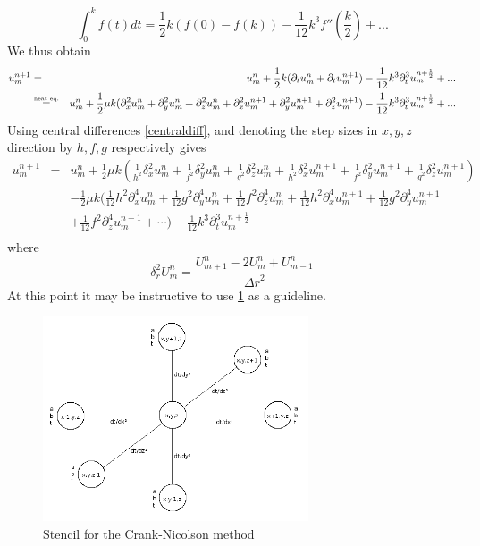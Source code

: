 \begin{equation}
\int_0^k f(t) dt = \frac{1}{2} k (f(0) - f(k)) -\frac{1}{12} k^3 f''(\frac{k}{2}) + ...
\label{trapezoidalrule}
\end{equation}
We thus obtain
\begin{eqnarray}
\label{res}
u_m^ {n+1} &=& u_m^ n + \frac{1}{2} k(\partial_t u_m^n + \partial_t u_m^{n+1}) - \frac{1}{12} k^3 \partial_t ^3 u_m^{n+\frac{1}{2}} + ...\\
&\stackrel{\text{\tiny heat eq.}}{=}& u_m^ n + \frac{1}{2} \mu k(\partial_x^2 u_m^n + \partial_y^2 u_m^n + \partial_z^2 u_m^n + \partial_x^2 u_m^{n+1} + \partial_y^2 u_m^{n+1} + \partial_z^2 u_m^{n+1}) - \frac{1}{12} k^3 \partial_t ^3    u_m^{n+\frac{1}{2}} + ... \nonumber
\end{eqnarray}
Using central differences \cref{centraldiff}, and denoting the step sizes in $x, y, z$ direction by $h, f, g$ respectively gives
\begin{eqnarray*}
u_m^{n+1} &=& u_m^ n + \frac{1}{2} \mu k(\frac{1}{h^2}\delta_x^2 u_m^n + \frac{1}{f^2}\delta_y^2 u_m^n + \frac{1}{g^2}\delta_z^2 u_m^n + \frac{1}{h^2}\delta_x^2 u_m^{n+1} + \frac{1}{f^2}\delta_y^2 u_m^{n+1} + \frac{1}{g^2}\delta_z^2 u_m^{n+1}) \\
  &&- \frac{1}{2} \mu k (\frac{1}{12}h^2\partial_x^4 u_m^n +
  \frac{1}{12}g^2\partial_y^4 u_m^n + \frac{1}{12}f^2\partial_z^4 u_m^n +
  \frac{1}{12}h^2\partial_x^4 u_m^{n+1} + \frac{1}{12}g^2\partial_y^4
  u_m^{n+1}\\
  &&+ \frac{1}{12}f^2\partial_z^4 u_m^{n+1} + \cdots)
  - \frac{1}{12} k^3 \partial_t ^3 u_m^{n+\frac{1}{2}} \\ 
\end{eqnarray*}
where
\begin{equation}
\delta_{r}^{2}U_m^{n}=\frac{U_{m+1}^{n}-2U_m^{n}+U_{m-1}^{n}}{{\Delta r}^{2}}
\label{centraldiff}
\end{equation}
At this point it may be instructive to use \cref{fig:stencil-numerics} as a guideline.

\begin{figure}[h!]
  \begin{center}
    \includegraphics[width=0.7\textwidth]{stencil.png}
  \end{center}
  \caption{Stencil for the Crank-Nicolson method}
  \label{fig:stencil-numerics}
\end{figure}

